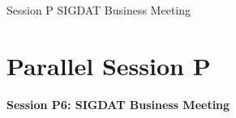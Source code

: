 \clearpage
{}
\begin{ThreeSessionOverview}{Session P}{\daydateyear}
  {SIGDAT Business Meeting}
\end{ThreeSessionOverview}

\newpage
\section*{Parallel Session P}
{\bfseries\large Session P6: SIGDAT Business Meeting}\\
\TrackALoc\hfill\sessionchair{}{}
\clearpage


